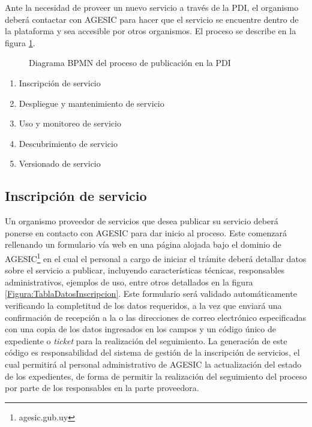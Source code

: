     Ante la necesidad de proveer un nuevo servicio a través de la PDI, el organismo deberá contactar con AGESIC para hacer que el servicio se encuentre dentro de la plataforma y sea accesible por otros organismos. El proceso se describe en la figura \ref{Figura:ProcesoPublicacionPDI}.

    \begin{figure}[h]
      \centering
      \caption{Diagrama BPMN del proceso de publicación en la PDI}
      \label{Figura:ProcesoPublicacionPDI}
    \end{figure}

    \begin{enumerate}
      \item Inscripción de servicio
      \item Despliegue y mantenimiento de servicio
      \item Uso y monitoreo de servicio
      \item Descubrimiento de servicio
      \item Versionado de servicio
    \end{enumerate}

    \subsection{Inscripción de servicio}
      \label{Solucion:Gobernanza:CicloDeVidaAGESIC:Inscripcion}

      Un organismo proveedor de servicios que desea publicar su servicio deberá ponerse en contacto con AGESIC para dar inicio al proceso. Este comenzará rellenando un formulario vía web en una página alojada bajo el dominio de AGESIC\footnote{agesic.gub.uy} en el cual el personal a cargo de iniciar el trámite deberá detallar datos sobre el servicio a publicar, incluyendo características técnicas, responsables administrativos, ejemplos de uso, entre otros detallados en la figura \ref{Figura:TablaDatosInscripcion}. Este formulario será validado automáticamente verificando la completitud de los datos requeridos, a la vez que enviará una confirmación de recepción a la o las direcciones de correo electrónico especificadas con una copia de los datos ingresados en los campos y un código único de expediente o \emph{ticket} para la realización del seguimiento. La generación de este código es responsabilidad del sistema de gestión de la inscripción de servicios, el cual permitirá al personal administrativo de AGESIC la actualización del estado de los expedientes, de forma de permitir la realización del seguimiento del proceso por parte de los responsables en la parte proveedora.

